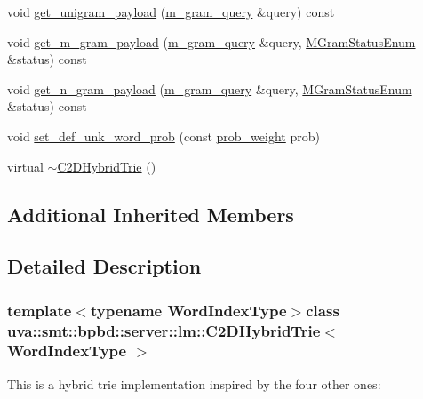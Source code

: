 \begin{DoxyCompactItemize}
\item 
void \hyperlink{classuva_1_1smt_1_1bpbd_1_1server_1_1lm_1_1_c2_d_hybrid_trie_aadb8c0ee1673842d79c6818a4b961305}{get\+\_\+unigram\+\_\+payload} (\hyperlink{classuva_1_1smt_1_1bpbd_1_1server_1_1lm_1_1m__gram__query}{m\+\_\+gram\+\_\+query} \&query) const 
\item 
void \hyperlink{classuva_1_1smt_1_1bpbd_1_1server_1_1lm_1_1_c2_d_hybrid_trie_ad6eef8f69e7bf51c9faa23844a7d5417}{get\+\_\+m\+\_\+gram\+\_\+payload} (\hyperlink{classuva_1_1smt_1_1bpbd_1_1server_1_1lm_1_1m__gram__query}{m\+\_\+gram\+\_\+query} \&query, \hyperlink{namespaceuva_1_1smt_1_1bpbd_1_1server_1_1lm_ab9b3e7382b561dcb8abcd6b55e9b796a}{M\+Gram\+Status\+Enum} \&status) const 
\item 
void \hyperlink{classuva_1_1smt_1_1bpbd_1_1server_1_1lm_1_1_c2_d_hybrid_trie_a3fff4458a73cf7fe82754672d8272a12}{get\+\_\+n\+\_\+gram\+\_\+payload} (\hyperlink{classuva_1_1smt_1_1bpbd_1_1server_1_1lm_1_1m__gram__query}{m\+\_\+gram\+\_\+query} \&query, \hyperlink{namespaceuva_1_1smt_1_1bpbd_1_1server_1_1lm_ab9b3e7382b561dcb8abcd6b55e9b796a}{M\+Gram\+Status\+Enum} \&status) const 
\item 
void \hyperlink{classuva_1_1smt_1_1bpbd_1_1server_1_1lm_1_1_c2_d_hybrid_trie_a34a846bcae91c4c201d69ea2a4155e1e}{set\+\_\+def\+\_\+unk\+\_\+word\+\_\+prob} (const \hyperlink{namespaceuva_1_1smt_1_1bpbd_1_1server_a01e9ea4de9c226f4464862e84ff0bbcc}{prob\+\_\+weight} prob)
\item 
virtual \hyperlink{classuva_1_1smt_1_1bpbd_1_1server_1_1lm_1_1_c2_d_hybrid_trie_a4fad81f10dd8ea2fcdd5bcb760b2b9b9}{$\sim$\+C2\+D\+Hybrid\+Trie} ()
\end{DoxyCompactItemize}
\subsection*{Additional Inherited Members}


\subsection{Detailed Description}
\subsubsection*{template$<$typename Word\+Index\+Type$>$class uva\+::smt\+::bpbd\+::server\+::lm\+::\+C2\+D\+Hybrid\+Trie$<$ Word\+Index\+Type $>$}

This is a hybrid trie implementation inspired by the four other ones\+:

